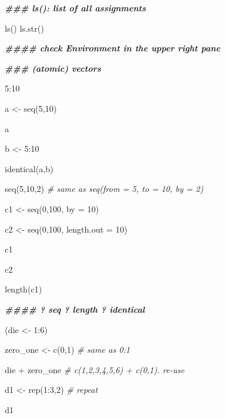 \documentclass[
]{bxjsbook}
\newenvironment{Shaded}{\begin{snugshade}}{\end{snugshade}}
\newcommand{\AttributeTok}[1]{\textcolor[rgb]{0.77,0.63,0.00}{#1}}
\newcommand{\CommentTok}[1]{\textcolor[rgb]{0.56,0.35,0.01}{\textit{#1}}}
\newcommand{\DecValTok}[1]{\textcolor[rgb]{0.00,0.00,0.81}{#1}}
\newcommand{\DocumentationTok}[1]{\textcolor[rgb]{0.56,0.35,0.01}{\textbf{\textit{#1}}}}
\newcommand{\FunctionTok}[1]{\textcolor[rgb]{0.00,0.00,0.00}{#1}}
\newcommand{\NormalTok}[1]{#1}
\newcommand{\OtherTok}[1]{\textcolor[rgb]{0.56,0.35,0.01}{#1}}
\newcommand{\SpecialCharTok}[1]{\textcolor[rgb]{0.00,0.00,0.00}{#1}}
\theoremstyle{definition}
\theoremstyle{definition}
\theoremstyle{definition}
\theoremstyle{definition}
\theoremstyle{remark}
\begin{document}
\begin{Shaded}
\begin{Highlighting}[]
\DocumentationTok{\#\#\# ls(): list of all assignments}

\FunctionTok{ls}\NormalTok{()}
\FunctionTok{ls.str}\NormalTok{()}

\DocumentationTok{\#\#\#\# check Environment in the upper right pane}

\DocumentationTok{\#\#\# (atomic) vectors}

\DecValTok{5}\SpecialCharTok{:}\DecValTok{10}

\NormalTok{a }\OtherTok{\textless{}{-}} \FunctionTok{seq}\NormalTok{(}\DecValTok{5}\NormalTok{,}\DecValTok{10}\NormalTok{)}

\NormalTok{a}

\NormalTok{b }\OtherTok{\textless{}{-}} \DecValTok{5}\SpecialCharTok{:}\DecValTok{10}

\FunctionTok{identical}\NormalTok{(a,b)}

\FunctionTok{seq}\NormalTok{(}\DecValTok{5}\NormalTok{,}\DecValTok{10}\NormalTok{,}\DecValTok{2}\NormalTok{) }\CommentTok{\# same as seq(from = 5, to = 10, by = 2)}

\NormalTok{c1 }\OtherTok{\textless{}{-}} \FunctionTok{seq}\NormalTok{(}\DecValTok{0}\NormalTok{,}\DecValTok{100}\NormalTok{, }\AttributeTok{by =} \DecValTok{10}\NormalTok{)}

\NormalTok{c2 }\OtherTok{\textless{}{-}} \FunctionTok{seq}\NormalTok{(}\DecValTok{0}\NormalTok{,}\DecValTok{100}\NormalTok{, }\AttributeTok{length.out =} \DecValTok{10}\NormalTok{)}

\NormalTok{c1}

\NormalTok{c2}

\FunctionTok{length}\NormalTok{(c1)}

\DocumentationTok{\#\#\#\# ? seq   ? length   ? identical}

\NormalTok{(die }\OtherTok{\textless{}{-}} \DecValTok{1}\SpecialCharTok{:}\DecValTok{6}\NormalTok{)}

\NormalTok{zero\_one }\OtherTok{\textless{}{-}} \FunctionTok{c}\NormalTok{(}\DecValTok{0}\NormalTok{,}\DecValTok{1}\NormalTok{) }\CommentTok{\# same as 0:1}

\NormalTok{die }\SpecialCharTok{+}\NormalTok{ zero\_one }\CommentTok{\# c(1,2,3,4,5,6) + c(0,1). re{-}use}

\NormalTok{d1 }\OtherTok{\textless{}{-}} \FunctionTok{rep}\NormalTok{(}\DecValTok{1}\SpecialCharTok{:}\DecValTok{3}\NormalTok{,}\DecValTok{2}\NormalTok{) }\CommentTok{\# repeat}


\NormalTok{d1}


\end{Highlighting}
\end{Shaded}
\end{document}
